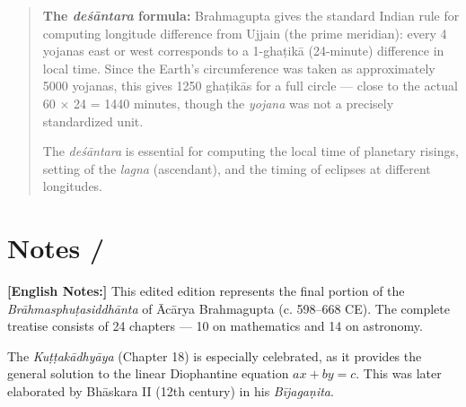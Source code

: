 \documentclass[10pt,a4paper]{article}
\newenvironment{engcommentary}
  {\begin{quote}\small\color{sectioncolor}}
  {\end{quote}}
\begin{document}
\vspace{1.5em}

\begin{engcommentary}
\textbf{The \textit{deśāntara} formula:} Brahmagupta gives the standard Indian rule for
computing longitude difference from Ujjain (the prime meridian): every 4 yojanas
east or west corresponds to a 1-ghaṭikā (24-minute) difference in local time.
Since the Earth's circumference was taken as approximately 5000 yojanas,
this gives 1250 ghaṭikās for a full circle --- close to the actual 60 $\times$ 24 = 1440
minutes, though the \textit{yojana} was not a precisely standardized unit.

The \textit{deśāntara} is essential for computing the local time of planetary risings,
setting of the \textit{lagna} (ascendant), and the timing of eclipses at different longitudes.
\end{engcommentary}

\vspace{1em}
\longline


\newpage
\section*{Notes / }

\begin{minipage}[t]{0.47\textwidth}
\end{minipage}%
\hfill\vline\hfill%
\begin{minipage}[t]{0.47\textwidth}
\textbf{[English Notes:]}
This edited edition represents the final portion of the \textit{Brāhmasphuṭasiddhānta}
of Ācārya Brahmagupta (c. 598--668 CE). The complete treatise consists of 24 chapters ---
10 on mathematics and 14 on astronomy.

The \textit{Kuṭṭakādhyāya} (Chapter 18) is especially celebrated, as it provides the general
solution to the linear Diophantine equation $ax + by = c$. This was later elaborated by
Bhāskara II (12th century) in his \textit{Bījagaṇita}.
\end{minipage}
\end{document}
